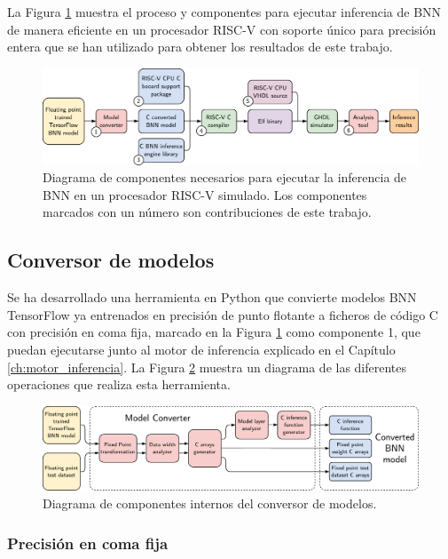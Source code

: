 La Figura \ref{fig:experiment_pipeline} muestra el proceso y componentes para ejecutar inferencia de BNN de manera eficiente en un procesador RISC-V con soporte único para precisión entera que se han utilizado para obtener los resultados de este trabajo.

\begin{figure}[h]
    \centering
    \includegraphics[width=\textwidth]{root/Imagenes/4_bnn_riscv/experiment_pipeline.pdf}
    \caption{Diagrama de componentes necesarios para ejecutar la inferencia de BNN en un procesador RISC-V simulado. Los componentes marcados con un número son contribuciones de este trabajo.}
    \label{fig:experiment_pipeline}
\end{figure}

\subsection{Conversor de modelos}

Se ha desarrollado una herramienta en Python que convierte modelos BNN TensorFlow ya entrenados en precisión de punto flotante a ficheros de código C con precisión en coma fija, marcado en la Figura \ref{fig:experiment_pipeline} como componente 1, que puedan ejecutarse junto al motor de inferencia explicado en el Capítulo \ref{ch:motor_inferencia}. La Figura \ref{fig:model_converter} muestra un diagrama de las diferentes operaciones que realiza esta herramienta.

\begin{figure}[h]
    \centering
    \includegraphics[width=\textwidth]{root/Imagenes/metodologia/model_converter.pdf}
    \caption{Diagrama de componentes internos del conversor de modelos.}
    \label{fig:model_converter}
\end{figure}

\subsubsection{Precisión en coma fija}

